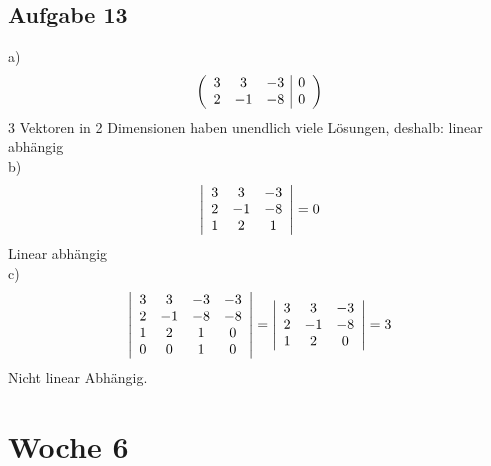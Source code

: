 \documentclass{article}
\begin{document}
\subsection*{Aufgabe 13}
a)\begin{equation*}
    \left(\begin{array}{c c c | c}
        3&3&-3&0\\
        2&-1&-8&0\\
    \end{array}\right)
\end{equation*}
3 Vektoren in 2 Dimensionen haben unendlich viele Lösungen, deshalb: linear abhängig\\
b)\begin{equation*}
    \left|\begin{array}{c c c}3&3&-3\\2&-1&-8\\1&2&1\end{array}\right| = 0
\end{equation*}
Linear abhängig\\
c)\begin{equation*}
    \left|\begin{array}{c c c c}3&3&-3&-3\\2&-1&-8&-8\\1&2&1&0\\0&0&1&0\end{array}\right| = \left|\begin{array}{c c c}3&3&-3\\2&-1&-8\\1&2&0\end{array}\right| = 3
\end{equation*}
Nicht linear Abhängig.

\section*{Woche 6}
\end{document}
